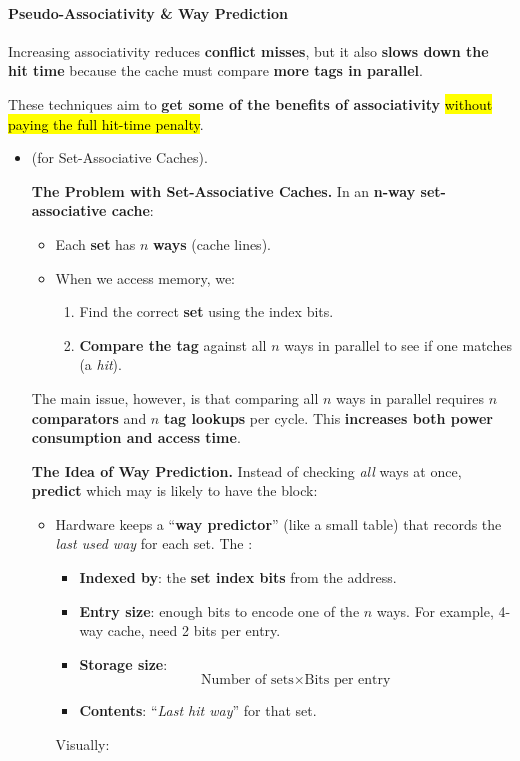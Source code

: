 \paragraph{Pseudo-Associativity \& Way Prediction}

Increasing associativity reduces \textbf{conflict misses}, but it also \textbf{slows down the hit time} because the cache must compare \textbf{more tags in parallel}.

\highspace
These techniques aim to \textbf{get some of the benefits of associativity} \hl{without paying the full hit-time penalty}.
\begin{itemize}
    \item {} (for Set-Associative Caches).
    
    \textcolor{Red2}{ \textbf{The Problem with Set-Associative Caches.}} In an \textbf{n-way set-associative cache}:
    \begin{itemize}
        \item Each \textbf{set} has $n$ \textbf{ways} (cache lines).
        \item When we access memory, we:
        \begin{enumerate}
            \item Find the correct \textbf{set} using the index bits.
            \item \textbf{Compare the tag} against all $n$ ways in parallel to see if one matches (a \emph{hit}).
        \end{enumerate}
    \end{itemize}
    The main issue, however, is that comparing all $n$ ways in parallel requires $n$ \textbf{comparators} and $n$ \textbf{tag lookups} per cycle. This \textbf{increases both power consumption and access time}.

    \textcolor{Green3}{ \textbf{The Idea of Way Prediction.}} Instead of checking \emph{all} ways at once, \textbf{predict} which may is likely to have the block:
    \begin{itemize}
        \item Hardware keeps a ``\textbf{way predictor}'' (like a small table) that records the \emph{last used way} for each set. The :
        \begin{itemize}
            \item \textbf{Indexed by}: the \textbf{set index bits} from the address.
            \item \textbf{Entry size}: enough bits to encode one of the $n$ ways. For example, 4-way cache, need 2 bits per entry.
            \item \textbf{Storage size}:
            \begin{equation*}
                \text{Number of sets} \times \text{Bits per entry}
            \end{equation*}
            \item \textbf{Contents}: ``\emph{Last hit way}'' for that set.
        \end{itemize}
        Visually:


\end{itemize}
\end{itemize}
